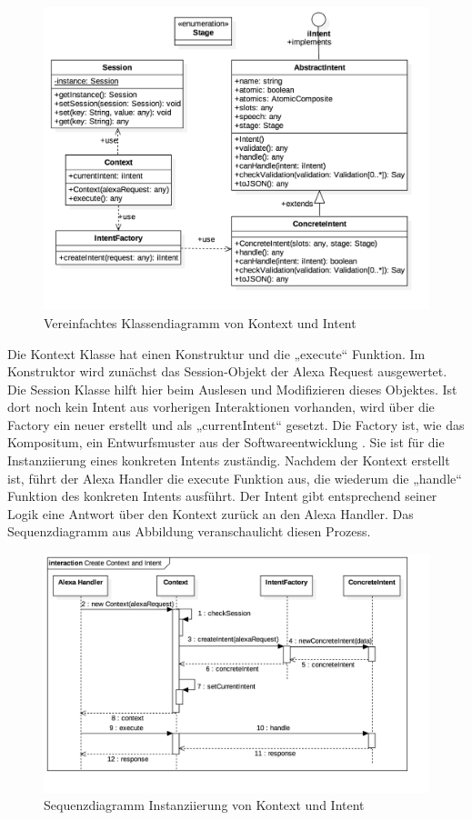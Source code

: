 \begin{figure}[!htb]
    \centering
    \includegraphics[width=1.0\textwidth]{bilder/4_klassenContext.png}
    \caption{Vereinfachtes Klassendiagramm von Kontext und Intent}
    \label{fig:skill-klassen-kontext}
\end{figure}

Die Kontext Klasse hat einen Konstruktur und die „execute“ Funktion. Im Konstruktor wird zunächst das Session-Objekt der Alexa Request ausgewertet. Die Session Klasse hilft hier beim Auslesen und Modifizieren dieses Objektes. Ist dort noch kein Intent aus vorherigen Interaktionen vorhanden, wird über die Factory ein neuer erstellt und als „currentIntent“ gesetzt. Die Factory ist, wie das Kompositum, ein Entwurfsmuster aus der Softwareentwicklung \cite{freeman-headfirst-patterns}. Sie ist für die Instanziierung eines konkreten Intents zuständig. Nachdem der Kontext erstellt ist, führt der Alexa Handler die execute Funktion aus, die wiederum die „handle“ Funktion des konkreten Intents ausführt. Der Intent gibt entsprechend seiner Logik eine Antwort über den Kontext zurück an den Alexa Handler. Das Sequenzdiagramm aus Abbildung veranschaulicht diesen Prozess.

\begin{figure}[!htb]
    \centering
    \includegraphics[width=1.0\textwidth]{bilder/4_skillSequenzKontextIntent.png}
    \caption{Sequenzdiagramm Instanziierung von Kontext und Intent}
    \label{fig:skill-sequenz-kontext}
\end{figure}

